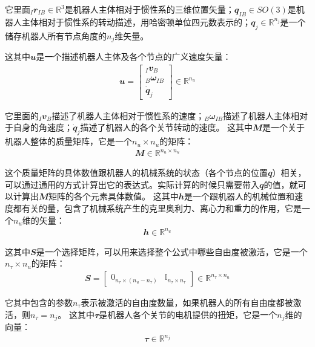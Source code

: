 它里面$_I {\mathbfit r}_{IB} \in {\mathbb R}^{3}$是机器人主体相对于惯性系的三维位置矢量；${\mathbfit q}_{IB} \in SO(3)$是机器人主体相对于惯性系的转动描述，用哈密顿单位四元数表示的；${\mathbfit q}_j \in {\mathbb R}^{n_j}$是一个储存机器人所有节点角度的$n_j$维矢量。


这其中${\mathbfit u}$是一个描述机器人主体及各个节点的广义速度矢量：
\begin{align}
    {\mathbfit u}= \begin{bmatrix}_I{\mathbfit v}_B \\ _B{\mathbfit \omega}_{IB} \\ \dot {\mathbfit q}_j \end{bmatrix} \in {\mathbb R}^{n_u} 
\end{align}

它里面的$_I{\mathbfit v}_B$描述了机器人主体相对于惯性系的速度；$_B{\mathbfit \omega}_{IB}$描述了机器人主体相对于自身的角速度；$\dot {\mathbfit q}_j$描述了机器人的各个关节转动的速度。
这其中${\mathbfit M}$是一个关于机器人整体的质量矩阵，它是一个$n_u \times n_u$的矩阵： 
\begin{align}
    {\mathbfit M} \in {\mathbb R}^{n_u \times n_u}
\end{align}

这个质量矩阵的具体数值跟机器人的机械系统的状态（各个节点的位置${\mathbfit q}$）相关，可以通过通用的方式计算出它的表达式。实际计算的时候只需要带入${\mathbfit q}$的值，就可以计算出${\mathbfit M}$矩阵的各个元素具体数值。
这其中${\mathbfit h}$是一个跟机器人的机械位置和速度都有关的量，包含了机械系统产生的克里奥利力、离心力和重力的作用，它是一个$n_u$维的矢量：
\begin{align}
    {\mathbfit h} \in {\mathbb R}^{n_u}
\end{align}

这其中${\mathbfit S}$是一个选择矩阵，可以用来选择整个公式中哪些自由度被激活，它是一个$n_{\tau} \times n_u$的矩阵：
\begin{align}
    {\mathbfit S} = \begin{bmatrix}{\mathbfit 0}_{n_{\tau} \times (n_u - n_{\tau})} & {\mathbb I}_{n_{\tau} \times n_{\tau}}\end{bmatrix} \in {\mathbb R}^{n_{\tau} \times n_u} 
\end{align}

它其中包含的参数$n_{\tau}$表示被激活的自由度数量，如果机器人的所有自由度都被激活，则$n_{\tau} = n_j$。
这其中${\mathbfit \tau}$是机器人各个关节的电机提供的扭矩，它是一个$n_j$维的向量：
\begin{align}
    {\mathbfit \tau} \in {\mathbb R}^{n_j} 
\end{align}

